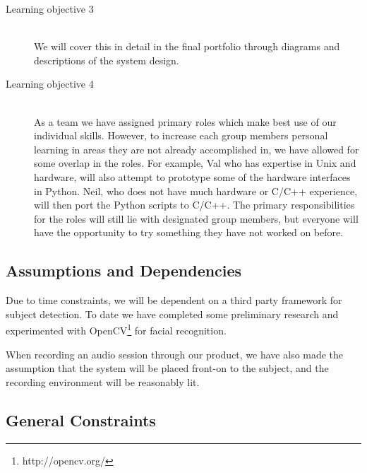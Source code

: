 \documentclass[11pt,a4paper,titlepage]{report}
\begin{document}
\begin{description}
  \item[Learning objective 3] \hfill \\
We will cover this in detail in the final portfolio through diagrams and descriptions of the system design.

  \item[Learning objective 4] \hfill \\
As a team we have assigned primary roles which make best use of our individual skills. However, to increase each group members personal learning in areas they are not already accomplished in, we have allowed for some overlap in the roles. For example, Val who has expertise in Unix and hardware, will also attempt to prototype some of the hardware interfaces in Python. Neil, who does not have much hardware or C/C++ experience, will then port the Python scripts to C/C++. The primary responsibilities for the roles will still lie with designated group members, but everyone will have the opportunity to try something they have not worked on before.

\end{description}




\subsection{Assumptions and Dependencies}

Due to time constraints, we will be dependent on a third party framework for subject detection. To date we have completed some preliminary research and experimented with OpenCV\footnote{http://opencv.org/} for facial recognition.

When recording an audio session through our product, we have also made the assumption that the system will be placed front-on to the subject, and the recording environment will be reasonably lit.


\subsection{General Constraints}
\end{document}
